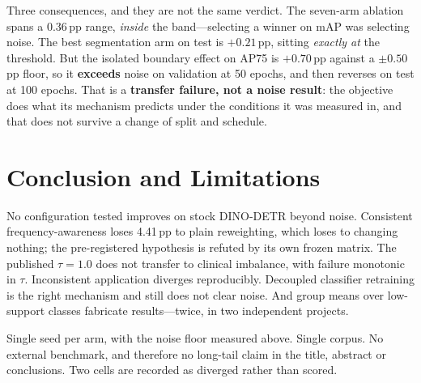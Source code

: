 \documentclass[11pt,letterpaper]{article}
\begin{document}
Three consequences, and they are not the same verdict. The seven-arm ablation
spans a 0.36\,pp range, \emph{inside} the band---selecting a winner on mAP was
selecting noise. The best segmentation arm on test is $+0.21$\,pp, sitting
\emph{exactly at} the threshold. But the isolated boundary effect on AP75 is
$+0.70$\,pp against a $\pm0.50$\,pp floor, so it \textbf{exceeds} noise on
validation at 50 epochs, and then reverses on test at 100 epochs. That is a
\textbf{transfer failure, not a noise result}: the objective does what its
mechanism predicts under the conditions it was measured in, and that does not
survive a change of split and schedule.

\section{Conclusion and Limitations}

No configuration tested improves on stock DINO-DETR beyond noise. Consistent
frequency-awareness loses 4.41\,pp to plain reweighting, which loses to changing
nothing; the pre-registered hypothesis is refuted by its own frozen matrix. The
published $\tau=1.0$ does not transfer to clinical imbalance, with failure
monotonic in $\tau$. Inconsistent application diverges reproducibly. Decoupled
classifier retraining is the right mechanism and still does not clear noise. And
group means over low-support classes fabricate results---twice, in two
independent projects.

Single seed per arm, with the noise floor measured above. Single corpus.
No external benchmark, and therefore no long-tail claim in the title, abstract
or conclusions. Two cells are recorded as diverged rather than scored.

{\small


}
\end{document}
